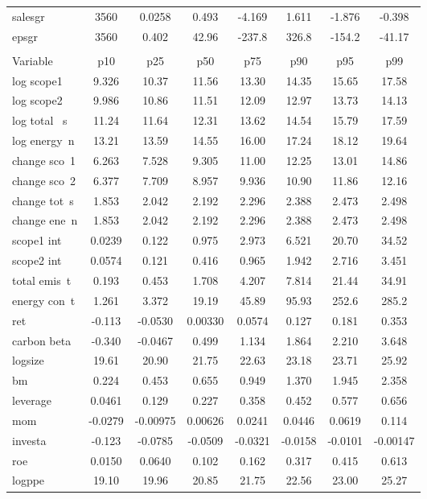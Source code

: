 \documentclass[]{article}
\begin{document}
\begin{tabular}{lccccccc}
salesgr & 3560 & 0.0258 & 0.493 & -4.169 & 1.611 & -1.876 & -0.398 \\
epsgr & 3560 & 0.402 & 42.96 & -237.8 & 326.8 & -154.2 & -41.17 \\
 &  &  &  &  &  &  &  \\
Variable & p10 & p25 & p50 & p75 & p90 & p95 & p99 \\
log scope1 & 9.326 & 10.37 & 11.56 & 13.30 & 14.35 & 15.65 & 17.58 \\
log scope2 & 9.986 & 10.86 & 11.51 & 12.09 & 12.97 & 13.73 & 14.13 \\
log total ~s & 11.24 & 11.64 & 12.31 & 13.62 & 14.54 & 15.79 & 17.59 \\
log energy~n & 13.21 & 13.59 & 14.55 & 16.00 & 17.24 & 18.12 & 19.64 \\
change sco~1 & 6.263 & 7.528 & 9.305 & 11.00 & 12.25 & 13.01 & 14.86 \\
change sco~2 & 6.377 & 7.709 & 8.957 & 9.936 & 10.90 & 11.86 & 12.16 \\
change tot~s & 1.853 & 2.042 & 2.192 & 2.296 & 2.388 & 2.473 & 2.498 \\
change ene~n & 1.853 & 2.042 & 2.192 & 2.296 & 2.388 & 2.473 & 2.498 \\
scope1 int & 0.0239 & 0.122 & 0.975 & 2.973 & 6.521 & 20.70 & 34.52 \\
scope2 int & 0.0574 & 0.121 & 0.416 & 0.965 & 1.942 & 2.716 & 3.451 \\
total emis~t & 0.193 & 0.453 & 1.708 & 4.207 & 7.814 & 21.44 & 34.91 \\
energy con~t & 1.261 & 3.372 & 19.19 & 45.89 & 95.93 & 252.6 & 285.2 \\
ret & -0.113 & -0.0530 & 0.00330 & 0.0574 & 0.127 & 0.181 & 0.353 \\
carbon beta & -0.340 & -0.0467 & 0.499 & 1.134 & 1.864 & 2.210 & 3.648 \\
logsize & 19.61 & 20.90 & 21.75 & 22.63 & 23.18 & 23.71 & 25.92 \\
bm & 0.224 & 0.453 & 0.655 & 0.949 & 1.370 & 1.945 & 2.358 \\
leverage & 0.0461 & 0.129 & 0.227 & 0.358 & 0.452 & 0.577 & 0.656 \\
mom & -0.0279 & -0.00975 & 0.00626 & 0.0241 & 0.0446 & 0.0619 & 0.114 \\
investa & -0.123 & -0.0785 & -0.0509 & -0.0321 & -0.0158 & -0.0101 & -0.00147 \\
roe & 0.0150 & 0.0640 & 0.102 & 0.162 & 0.317 & 0.415 & 0.613 \\
logppe & 19.10 & 19.96 & 20.85 & 21.75 & 22.56 & 23.00 & 25.27 \\

\end{tabular}
\end{document}

